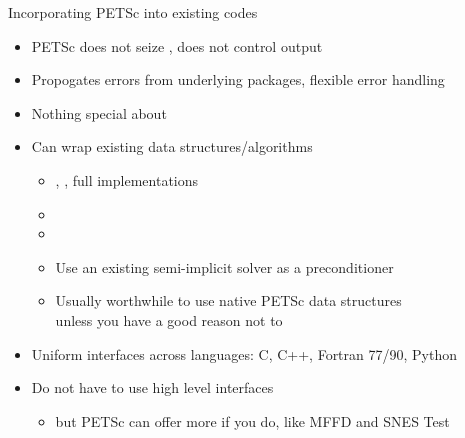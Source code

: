 \begin{frame}{Incorporating PETSc into existing codes}
  \begin{itemize}
  \item PETSc does not seize , does not control output
  \item Propogates errors from underlying packages, flexible error handling
  \item Nothing special about 
  \item Can wrap existing data structures/algorithms
    \begin{itemize}
    \item {}, , full implementations
    \item {}
    \item {}
    \item Use an existing semi-implicit solver as a preconditioner
    \item Usually worthwhile to use native PETSc data structures \\
      unless you have a good reason not to
    \end{itemize}
  \item Uniform interfaces across languages: C, C++, Fortran 77/90, Python
  \item Do not have to use high level interfaces
    \begin{itemize}
    \item but PETSc can offer more if you do, like MFFD and SNES Test
    \end{itemize}
  \end{itemize}
\end{frame}
